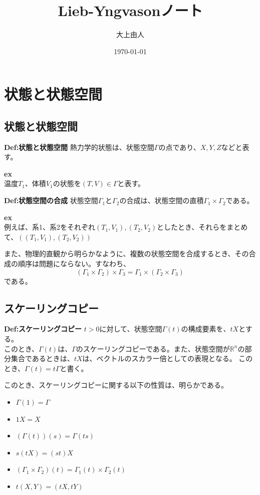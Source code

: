 \documentclass[a4paper,11pt]{jsarticle}
\begin{document}
\title{Lieb-Yngvasonノート}
\author{大上由人}
\date{\today}
\maketitle
\tableofcontents
\newpage
\section{状態と状態空間}
\subsection{状態と状態空間}
\begin{itembox}[l]{\textbf{Def:状態と状態空間}}
熱力学的状態は、状態空間$\Gamma$の点であり、$X,Y,Z$などと表す。
\end{itembox}
\textbf{ex}\\
温度$T_1$、体積$V_1$の状態を$(T,V) \in \Gamma$と表す。

\begin{itembox}[l]{\textbf{Def:状態空間の合成}}
    状態空間$\Gamma_1$と$\Gamma_2$の合成は、状態空間の直積$\Gamma_1 \times \Gamma_2$である。
\end{itembox}
\textbf{ex}\\
例えば、系1、系2をそれぞれ$(T_1,V_1),(T_2,V_2)$としたとき、それらをまとめて、$((T_1,V_1),(T_2,V_2))$

また、物理的直観から明らかなように、複数の状態空間を合成するとき、その合成の順序は問題にならない。すなわち、
\begin{equation}
    (\Gamma_1 \times \Gamma_2) \times \Gamma_3 = \Gamma_1 \times (\Gamma_2 \times \Gamma_3)
\end{equation}
である。

\subsection{スケーリングコピー}
\begin{itembox}[l]{\textbf{Def:スケーリングコピー}}
    $t>0$に対して、状態空間$\Gamma(t)$の構成要素を、$tX$とする。\\
    このとき、$\Gamma(t)$は、$\Gamma$のスケーリングコピーである。また、状態空間が$\mathbb{R}^n$の部分集合であるときは、$tX$は、ベクトルのスカラー倍としての表現となる。
    このとき、$\Gamma(t)=t\Gamma$と書く。
\end{itembox}
このとき、スケーリングコピーに関する以下の性質は、明らかである。
\begin{itemize}
    \item $\Gamma(1)=\Gamma$
    \item $1X=X$
    \item $(\Gamma(t))(s)=\Gamma(ts)$
    \item $s(tX)=(st)X$
    \item $(\Gamma_1 \times \Gamma_2)(t)=\Gamma_1(t) \times \Gamma_2(t)$
    \item $t(X,Y)=(tX,tY)$
\end{itemize}
\end{document}
